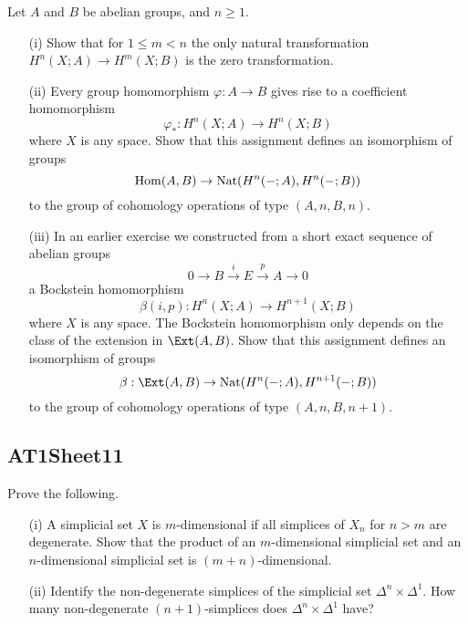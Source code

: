 \begin{sketch}
\end{sketch}

\label{exercise:AT1Sheet10.3}
Let $A$ and $B$ be abelian groups, and $n\ge1$.
\begin{enumerate}
    \item[(i)] Show that for $1\le m<n$ the only natural transformation $H^n(X; A) \to H^m(X; B)$ is the zero transformation.
    \item[(ii)] Every group homomorphism $\varphi : A \to B$ gives rise to a coefficient homomorphism
    \[
    \varphi_* : H^n(X; A) \to H^n(X; B)
    \]
    where $X$ is any space. Show that this assignment defines an isomorphism of groups
    \[
    \operatorname{Hom}(A, B) \to \operatorname{Nat}(H^n(-; A), H^n(-; B))
    \]
    to the group of cohomology operations of type $(A, n, B, n)$.
    \item[(iii)] In an earlier exercise we constructed from a short exact sequence of abelian groups
    \[ 0 \to B \xrightarrow{i} E \xrightarrow{p} A \to 0\]
    a Bockstein homomorphism
    \[
    \beta(i, p): H^n(X; A) \to H^{n+1}(X; B)
    \]
    where $X$ is any space. The Bockstein homomorphism only depends on the class of the extension in $\Ext(A, B)$.
    Show that this assignment defines an isomorphism of groups
    \[
    \beta : \Ext(A, B) \to \Nat(H^n(-; A), H^{n+1}(-; B))
    \]
    to the group of cohomology operations of type $(A, n, B, n + 1)$.
\end{enumerate}

\begin{sketch}
\end{sketch}

\subsection{AT1Sheet11}

\label{exercise:AT1Sheet11.1}
Prove the following.
\begin{enumerate}
    \item[(i)]A simplicial set $X$ is $m$-dimensional if all simplices of $X_n$ for $n > m$ are degenerate.
Show that the product of an $m$-dimensional simplicial set and an $n$-dimensional
simplicial set is $(m + n)$-dimensional.
    \item[(ii)] Identify the non-degenerate simplices of the simplicial set $\Delta^n \times\Delta^1$. How many non-degenerate $(n + 1)$-simplices does $\Delta^n\times\Delta^1$ have?
    \end{enumerate}

